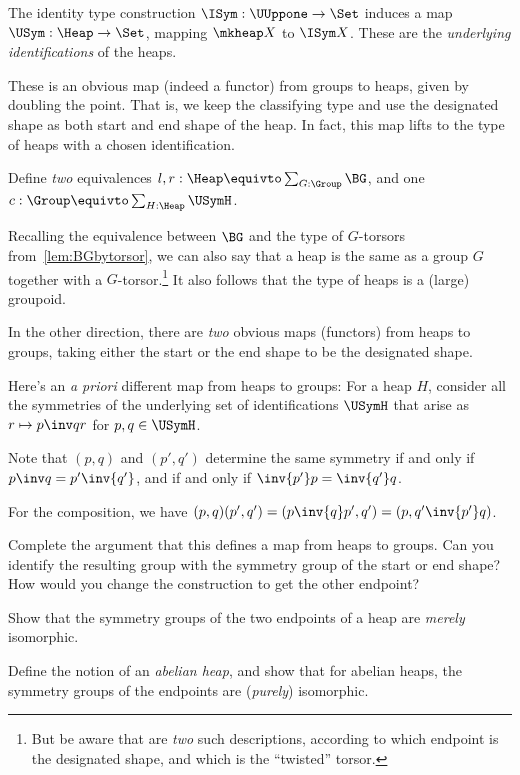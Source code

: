 The identity type construction $\ISym : \UUppone \to \Set$
induces a map $\USym : \Heap \to \Set$,
mapping $\mkheap X$ to $\ISym X$.
These are the \emph{underlying identifications} of the heaps.

These is an obvious map (indeed a functor) from groups to heaps,
given by doubling the point.
That is, we keep the classifying type and use the designated shape
as both start and end shape of the heap.
In fact, this map lifts to the type of heaps with a chosen identification.
\begin{exercise}\label{xca:group+torsor-heap}
  Define \emph{two} equivalences $l,r:\Heap \equivto \sum_{G:\Group}\BG$,
  and one $c:\Group \equivto \sum_{H:\Heap}\USymH$.
\end{exercise}
Recalling the equivalence between $\BG$ and the type of $G$-torsors
from~\cref{lem:BGbytorsor},
we can also say that a heap is the same
as a group $G$ together with a $G$-torsor.\footnote{%
  But be aware that are \emph{two} such descriptions,
  according to which endpoint is the designated shape,
  and which is the ``twisted'' torsor.}
It also follows that the type of heaps is a (large) groupoid.

In the other direction,
there are \emph{two} obvious maps (functors) from heaps to groups,
taking either the start or the end shape to be the designated shape.

Here's an \emph{a priori} different map from heaps to groups:
For a heap $H$, consider all the
symmetries of the underlying set of identifications $\USymH$
that arise as $r \mapsto p\inv q r$ for $p,q\in \USymH$.

Note that $(p,q)$ and $(p',q')$ determine the same symmetry
if and only if $p\inv q = p'\inv{q'}$, and if and only if
$\inv{p'}p = \inv{q'}q$.

For the composition, we have $(p,q)(p',q') = (p\inv{q}p',q') = (p,q'\inv{p'}q)$.

\begin{exercise}
  Complete the argument that this defines a map
  from heaps to groups. Can you identify the resulting group
  with the symmetry group of the start or end shape?
  How would you change the construction to get the other endpoint?
\end{exercise}

\begin{exercise}
  Show that the symmetry groups of the two endpoints of a heap
  are \emph{merely} isomorphic.

  Define the notion of an \emph{abelian heap},
  and show that for abelian heaps,
  the symmetry groups of the endpoints are (\emph{purely}) isomorphic.
\end{exercise}

